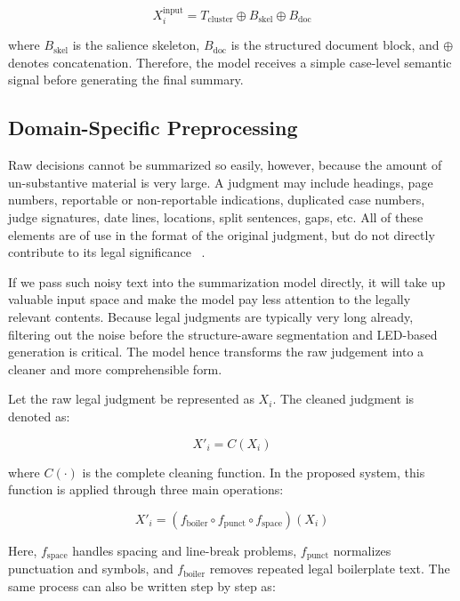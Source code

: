 \documentclass[11pt, a4paper]{article}
\theoremstyle{plain}%
\theoremstyle{remark}%
\theoremstyle{definition}%
\begin{document}
\begin{equation}
X_i^{\text{input}}=
T_{\text{cluster}}\oplus B_{\text{skel}}\oplus B_{\text{doc}}
\end{equation}

where \(B_{\text{skel}}\) is the salience skeleton, \(B_{\text{doc}}\) is the structured document block, and \(\oplus\) denotes concatenation. Therefore, the model receives a simple case-level semantic signal before generating the final summary.

\subsection{Domain-Specific Preprocessing}

Raw decisions cannot be summarized so easily, however, because the amount of un-substantive material is very large. A judgment may include headings, page numbers, reportable or non-reportable indications, duplicated case numbers, judge signatures, date lines, locations, split sentences, gaps, etc. All of these elements are of use in the format of the original judgment, but do not directly contribute to its legal significance ~\cite{b1,b4}.

If we pass such noisy text into the summarization model directly, it will take up valuable input space and make the model pay less attention to the legally relevant contents. Because legal judgments are typically very long already, filtering out the noise before the structure-aware segmentation and LED-based generation is critical. The model hence transforms the raw judgement into a cleaner and more comprehensible form. 

Let the raw legal judgment be represented as \(X_i\). The cleaned judgment is denoted as:

\begin{equation}
X'_i=C(X_i)
\end{equation}

where \(C(\cdot)\) is the complete cleaning function. In the proposed system, this function is applied through three main operations:

\begin{equation}
X'_i=
(f_{\text{boiler}} \circ f_{\text{punct}} \circ f_{\text{space}})(X_i)
\end{equation}

Here, \(f_{\text{space}}\) handles spacing and line-break problems, \(f_{\text{punct}}\) normalizes punctuation and symbols, and \(f_{\text{boiler}}\) removes repeated legal boilerplate text. The same process can also be written step by step as:
\end{document}
